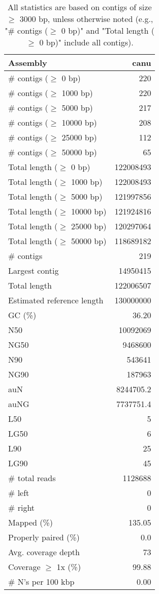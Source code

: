 \documentclass[12pt,a4paper]{article}
\begin{document}
\begin{table}[ht]
\begin{center}
\caption{All statistics are based on contigs of size $\geq$ 3000 bp, unless otherwise noted (e.g., "\# contigs ($\geq$ 0 bp)" and "Total length ($\geq$ 0 bp)" include all contigs).}
\begin{tabular}{|l*{1}{|r}|}
\hline
Assembly & canu \\ \hline
\# contigs ($\geq$ 0 bp) & 220 \\ \hline
\# contigs ($\geq$ 1000 bp) & 220 \\ \hline
\# contigs ($\geq$ 5000 bp) & 217 \\ \hline
\# contigs ($\geq$ 10000 bp) & 208 \\ \hline
\# contigs ($\geq$ 25000 bp) & 112 \\ \hline
\# contigs ($\geq$ 50000 bp) & 65 \\ \hline
Total length ($\geq$ 0 bp) & 122008493 \\ \hline
Total length ($\geq$ 1000 bp) & 122008493 \\ \hline
Total length ($\geq$ 5000 bp) & 121997856 \\ \hline
Total length ($\geq$ 10000 bp) & 121924816 \\ \hline
Total length ($\geq$ 25000 bp) & 120297064 \\ \hline
Total length ($\geq$ 50000 bp) & 118689182 \\ \hline
\# contigs & 219 \\ \hline
Largest contig & 14950415 \\ \hline
Total length & 122006507 \\ \hline
Estimated reference length & 130000000 \\ \hline
GC (\%) & 36.20 \\ \hline
N50 & 10092069 \\ \hline
NG50 & 9468600 \\ \hline
N90 & 543641 \\ \hline
NG90 & 187963 \\ \hline
auN & 8244705.2 \\ \hline
auNG & 7737751.4 \\ \hline
L50 & 5 \\ \hline
LG50 & 6 \\ \hline
L90 & 25 \\ \hline
LG90 & 45 \\ \hline
\# total reads & 1128688 \\ \hline
\# left & 0 \\ \hline
\# right & 0 \\ \hline
Mapped (\%) & 135.05 \\ \hline
Properly paired (\%) & 0.0 \\ \hline
Avg. coverage depth & 73 \\ \hline
Coverage $\geq$ 1x (\%) & 99.88 \\ \hline
\# N's per 100 kbp & 0.00 \\ \hline
\end{tabular}
\end{center}
\end{table}
\end{document}

